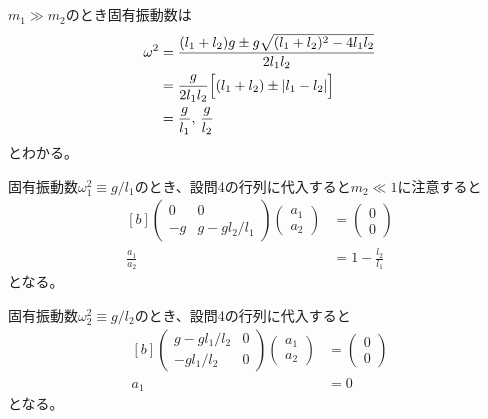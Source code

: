 \documentclass[../../sp_2016.tex]{subfiles}
\begin{document}
\subsection{}
\(m_1\gg m_2\)のとき固有振動数は
\begin{equation}\begin{aligned}[b]
    \omega^2 &= \frac{(l_1+l_2)g\pm g\sqrt{(l_1+l_2)^2-4l_1l_2}}{2l_1l_2}\\
    &= \frac{g}{2l_1l_2}\Bigl[(l_1+l_2)\pm\abs{l_1-l_2}\Bigr]\\
    &= \frac{g}{l_1},\,\frac{g}{l_2}
\end{aligned}\end{equation}
とわかる。

固有振動数\(\omega_1^2\equiv g/l_1\)のとき、設問4の行列に代入すると\(m_2\ll 1\)に注意すると
\begin{equation}\begin{aligned}[b]
    \begin{pmatrix}
        0 & 0 \\
        -g & g-gl_2/l_1
    \end{pmatrix}\begin{pmatrix}
        a_1\\a_2
    \end{pmatrix}
    &=\begin{pmatrix}
        0\\ 0
    \end{pmatrix}\\
    \frac{a_1}{a_2} &= 1-\frac{l_2}{l_1}
\end{aligned}\end{equation}
となる。

固有振動数\(\omega_2^2\equiv g/l_2\)のとき、設問4の行列に代入すると
\begin{equation}\begin{aligned}[b]
    \begin{pmatrix}
        g-gl_1/l_2 & 0 \\
        -gl_1/l_2 & 0
    \end{pmatrix}\begin{pmatrix}
        a_1\\a_2
    \end{pmatrix}
    &=\begin{pmatrix}
        0\\ 0
    \end{pmatrix}\\
    a_1 &= 0
\end{aligned}\end{equation}
となる。
\end{document}
